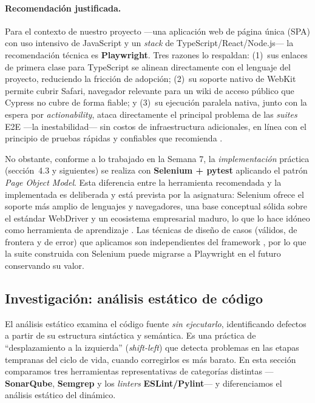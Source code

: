 \documentclass[12pt]{article}
\begin{document}
\paragraph{Recomendación justificada.}
Para el contexto de nuestro proyecto ---una aplicación web de página única (SPA) con uso
intensivo de JavaScript y un \textit{stack} de TypeScript/React/Node.js--- la
recomendación técnica es \textbf{Playwright}. Tres razones lo respaldan: (1)~sus enlaces
de primera clase para TypeScript se alinean directamente con el lenguaje del proyecto,
reduciendo la fricción de adopción; (2)~su soporte nativo de WebKit permite cubrir Safari,
navegador relevante para un wiki de acceso público que Cypress no cubre de forma fiable; y
(3)~su ejecución paralela nativa, junto con la espera por \textit{actionability}, ataca
directamente el principal problema de las \textit{suites} E2E ---la inestabilidad--- sin
costos de infraestructura adicionales, en línea con el principio de pruebas rápidas y
confiables que recomienda \citet{aniche2022}.

No obstante, conforme a lo trabajado en la Semana 7, la \emph{implementación} práctica
(sección~4.3 y siguientes) se realiza con \textbf{Selenium + pytest} aplicando el
patrón \textit{Page Object Model}. Esta diferencia entre la herramienta recomendada y la
implementada es deliberada y está prevista por la asignatura: Selenium ofrece el soporte
más amplio de lenguajes y navegadores, una base conceptual sólida sobre el estándar
WebDriver y un ecosistema empresarial maduro, lo que lo hace idóneo como herramienta de
aprendizaje \citep{garcia2022}. Las técnicas de diseño de casos (válidos, de frontera
y de error) que aplicamos son independientes del framework \citep{jorgensen2022}, por
lo que la suite construida con Selenium puede migrarse a Playwright en el futuro
conservando su valor.

\subsection{Investigación: análisis estático de código}
\label{sec:4-2}

El análisis estático examina el código fuente \emph{sin ejecutarlo}, identificando
defectos a partir de su estructura sintáctica y semántica. Es una práctica de
``desplazamiento a la izquierda'' (\textit{shift-left}) que detecta problemas en las
etapas tempranas del ciclo de vida, cuando corregirlos es más barato. En esta sección
comparamos tres herramientas representativas de categorías distintas
---\textbf{SonarQube}, \textbf{Semgrep} y los \textit{linters} \textbf{ESLint/Pylint}---
y diferenciamos el análisis estático del dinámico.
\end{document}
